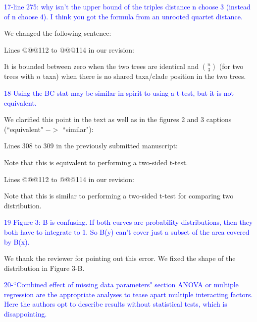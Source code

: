 \documentclass[11pt]{letter}
\begin{document}
\begin{letter}{}

\textcolor{blue}{17-line 275: why isn't the upper bound of the triples distance n choose 3 (instead of n choose 4). I think you got the formula from an unrooted quartet distance.}

We changed the following sentence: %

Lines @@@112 to @@@114 in our revision:

\hfill\begin{minipage}{\dimexpr\textwidth-1cm}
It is bounded between zero when the two trees are identical and $\binom{n}{3}$ (for two trees with $n$ taxa) when there is no shared taxa/clade position in the two trees.
\end{minipage}


\textcolor{blue}{18-Using the BC stat may be similar in spirit to using a t-test, but it is not equivalent.}

We clarified this point in the text as well as in the figures 2 and 3 captions (``equivalent" $->$ ``similar"):

Lines 308 to 309 in the previously submitted manuscript:

\hfill\begin{minipage}{\dimexpr\textwidth-1cm}
Note that this is equivalent to performing a two-sided t-test.
\end{minipage}

Lines @@@112 to @@@114 in our revision:

\hfill\begin{minipage}{\dimexpr\textwidth-1cm}
Note that this is similar to performing a two-sided t-test for comparing two distribution.
\end{minipage}


\textcolor{blue}{19-Figure 3: B is confusing. If both curves are probability distributions, then they both have to integrate to 1. So B(y) can't cover just a subset of the area covered by B(x).}

We thank the reviewer for pointing out this error. We fixed the shape of the distribution in Figure 3-B.


\textcolor{blue}{20-``Combined effect of missing data parameters" section ANOVA or multiple regression are the appropriate analyses to tease apart multiple interacting factors. Here the authors opt to describe results without statistical tests, which is disappointing.}


\end{letter}
\end{document}
